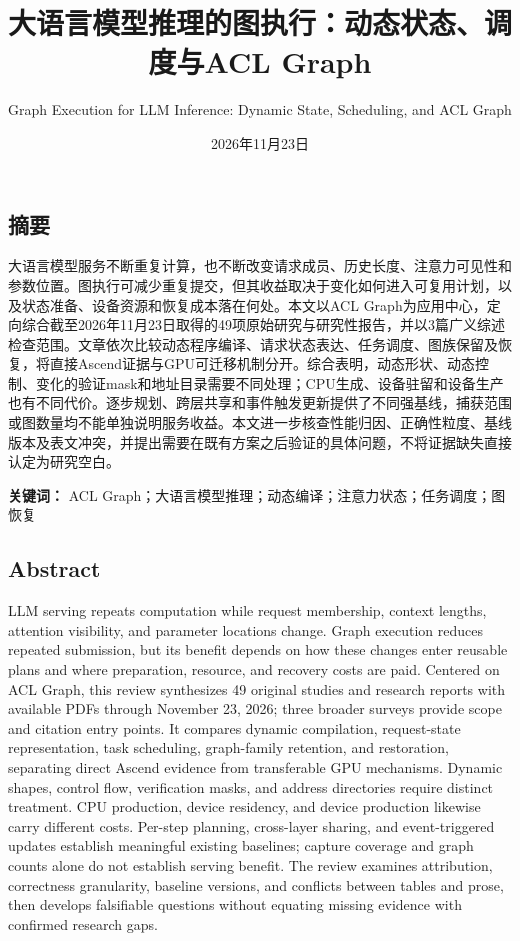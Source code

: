\documentclass[
  UTF8,
  zihao=5]{ctexart}
\title{大语言模型推理的图执行：动态状态、调度与ACL Graph}
\subtitle{Graph Execution for LLM Inference: Dynamic State, Scheduling,
and ACL Graph}
\author{}
\date{2026年11月23日}
\begin{document}
\maketitle

\hypertarget{ux6458ux8981}{%
\subsection*{摘要}\label{ux6458ux8981}}

大语言模型服务不断重复计算，也不断改变请求成员、历史长度、注意力可见性和参数位置。图执行可减少重复提交，但其收益取决于变化如何进入可复用计划，以及状态准备、设备资源和恢复成本落在何处。本文以ACL
Graph为应用中心，定向综合截至2026年11月23日取得的49项原始研究与研究性报告，并以3篇广义综述检查范围。文章依次比较动态程序编译、请求状态表达、任务调度、图族保留及恢复，将直接Ascend证据与GPU可迁移机制分开。综合表明，动态形状、动态控制、变化的验证mask和地址目录需要不同处理；CPU生成、设备驻留和设备生产也有不同代价。逐步规划、跨层共享和事件触发更新提供了不同强基线，捕获范围或图数量均不能单独说明服务收益。本文进一步核查性能归因、正确性粒度、基线版本及表文冲突，并提出需要在既有方案之后验证的具体问题，不将证据缺失直接认定为研究空白。

\textbf{关键词：} ACL
Graph；大语言模型推理；动态编译；注意力状态；任务调度；图恢复

\hypertarget{abstract}{%
\subsection*{Abstract}\label{abstract}}

LLM serving repeats computation while request membership, context
lengths, attention visibility, and parameter locations change. Graph
execution reduces repeated submission, but its benefit depends on how
these changes enter reusable plans and where preparation, resource, and
recovery costs are paid. Centered on ACL Graph, this review synthesizes
49 original studies and research reports with available PDFs through
November 23, 2026; three broader surveys provide scope and citation
entry points. It compares dynamic compilation, request-state
representation, task scheduling, graph-family retention, and
restoration, separating direct Ascend evidence from transferable GPU
mechanisms. Dynamic shapes, control flow, verification masks, and
address directories require distinct treatment. CPU production, device
residency, and device production likewise carry different costs.
Per-step planning, cross-layer sharing, and event-triggered updates
establish meaningful existing baselines; capture coverage and graph
counts alone do not establish serving benefit. The review examines
attribution, correctness granularity, baseline versions, and conflicts
between tables and prose, then develops falsifiable questions without
equating missing evidence with confirmed research gaps.
\end{document}
